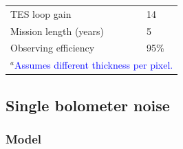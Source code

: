 \documentclass[]{spie}  %
\newcommand{\comr}[1]{\textcolor{red}{#1}}
\newcommand{\comb}[1]{\textcolor{blue}{#1}}
\begin{document}
\begin{table}[ht]
\begin{tabular}{|l|l|}
TES loop gain                    & 14                                \\
Mission length (years)           & 5                                                \\
Observing efficiency             & 95\%                                             \\
\hline
\multicolumn{2}{l}{\footnotesize $^a$\comb{Assumes different thickness per pixel.}}
\end{tabular}
\end{table}


\subsection{Single bolometer noise}
\label{sec:det_noise}

\subsubsection{Model}
\end{document}
